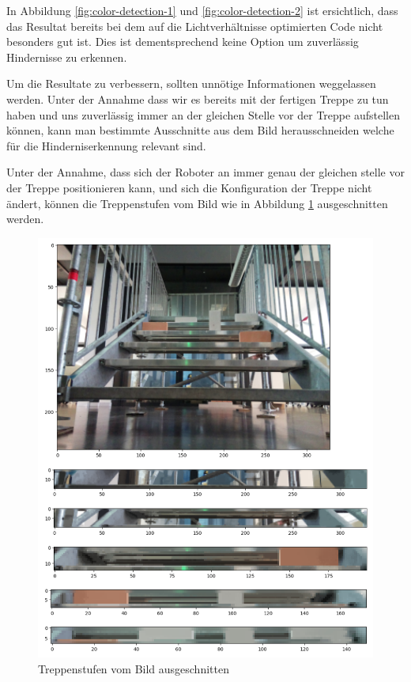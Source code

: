 In Abbildung \ref{fig:color-detection-1} und \ref{fig:color-detection-2} ist ersichtlich, dass das Resultat bereits bei dem auf die Lichtverhältnisse optimierten
Code nicht besonders gut ist. Dies ist dementsprechend keine Option um
zuverlässig Hindernisse zu erkennen.

Um die Resultate zu verbessern, sollten unnötige Informationen weggelassen werden.
Unter der Annahme dass wir es bereits mit der fertigen Treppe zu tun haben
und uns zuverlässig immer an der gleichen Stelle vor der Treppe
aufstellen können, kann man bestimmte Ausschnitte aus dem Bild herausschneiden
welche für die Hinderniserkennung relevant sind.

Unter der Annahme, dass sich der Roboter an immer genau der gleichen stelle vor der Treppe positionieren kann,
und sich die Konfiguration der Treppe nicht ändert, können die Treppenstufen vom Bild wie in Abbildung \ref{fig:extracted-stairs} ausgeschnitten werden.
\begin{figure}[H]
  \includegraphics[width=1.0\textwidth]{img/hinderniserkennung/extracted-stairs.png}
  \centering
  \caption{Treppenstufen vom Bild ausgeschnitten}
  \label{fig:extracted-stairs}
\end{figure}

